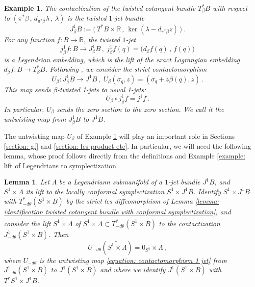 \documentclass{amsart}
\newtheorem{lemma}[thm]{Lemma}
\newtheorem{example}[thm]{Example}
\theoremstyle{remark}
\begin{document}
\begin{example}\label{example: twisted 1-jet}
The contactization of the twisted cotangent bundle $T_{\beta}^{\ast}B$
with respect to $(\pi^{\ast}\beta \,,\, d_{\pi^{\ast}\beta}\lambda \,,\, \lambda)$
is the twisted $1$-jet bundle
\[
J^1_{\beta} B := \big( \, T^{\ast}B \times \mathbb{R} \,,\,
\ker (\lambda - d_{\pi^{\ast}\beta}z) \, \big) \,.
\]
For any function $f: B \rightarrow \mathbb{R}$,
the twisted $1$-jet
\[
j^1_{\beta}f: B \rightarrow J^1_{\beta}B \,,\;
j^1_{\beta}f (q) = \big( d_{\beta}f (q) \,,\, f(q) \big)
\]
is a Legendrian embedding,
which is the lift of the exact Lagrangian embedding
$d_{\beta}f: B \rightarrow T_{\beta}^{\ast}B$.
Following \cite{CM},
we consider the strict contactomorphism
\begin{equation}\label{equation: contactomorphism 1 jet}
U_{\beta}: J^1_{\beta}B \rightarrow J^1B \,,\;
U_{\beta}(\sigma_q, z) = ( \sigma_q + z \beta(q), z ) \,.
\end{equation}
This map sends $\beta$-twisted 1-jets to usual 1-jets:
\[
U_{\beta} \circ j^1_{\beta}f = j^1f \,.
\] 
In particular,
$U_{\beta}$ sends the zero section to the zero section.
We call it the untwisting map from $J^1_{\beta}B$ to $J^1B$.
\end{example}

The untwisting map $U_{\beta}$ of Example \ref{example: twisted 1-jet}
will play an important role in Sections \ref{section: gf}
and \ref{section: lcs product etc}.
In particular,
we will need the following lemma,
whose proof follows directly from the definitions
and Example \ref{example: lift of Legendrians to symplectization}.

\begin{lemma}\label{lemma: untwisting of lift}
Let $\Lambda$ be a Legendriann submanifold
of a $1$-jet bundle $J^1B$,
and $S^1 \times \Lambda$ its lift
to the locally conformal symplectization $S^1 \times J^1B$.
Identify $S^1 \times J^1B$ with $T^{\ast}_{-d\theta} (S^1 \times B)$
by the strict lcs diffeomorphism
of Lemma \ref{lemma: identification twisted cotangent bundle with conformal symplectization},
and consider the lift $\widetilde{S^1 \times \Lambda}$
of $S^1 \times \Lambda \subset T^{\ast}_{-d\theta} (S^1 \times B)$
to the contactization $J^1_{-d\theta} (S^1 \times B)$.
Then
\[
U_{-d\theta} (\widetilde{S^1 \times \Lambda})
= 0_{S^1} \times \Lambda \,,
\]
where $U_{-d\theta}$ is the untwisting map \eqref{equation: contactomorphism 1 jet}
from $J^1_{-d\theta} (S^1 \times B)$ to $J^1 (S^1 \times B)$
and where we identify $J^1 (S^1 \times B)$ with $T^{\ast}S^1 \times J^1B$. 
\end{lemma}
\end{document}
